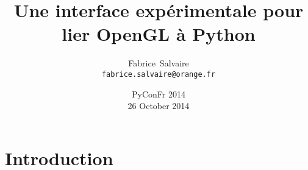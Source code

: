 




\title[]{Une interface expérimentale pour lier OpenGL à Python}
\author[F.~Salvaire]{Fabrice~Salvaire \\ \texttt{fabrice.salvaire@orange.fr}}
\date[26 oct 14]{PyConFr 2014 \\ 26 October 2014}


\newcommand{\Cpp}{C\nolinebreak[4]\hspace{-.05em}\raisebox{.4ex}{\tiny\bf ++}}




%
%

\begin{frame} %
  \titlepage
\end{frame}

%
%

\frame{\tableofcontents}

%
%

\section{Introduction}


